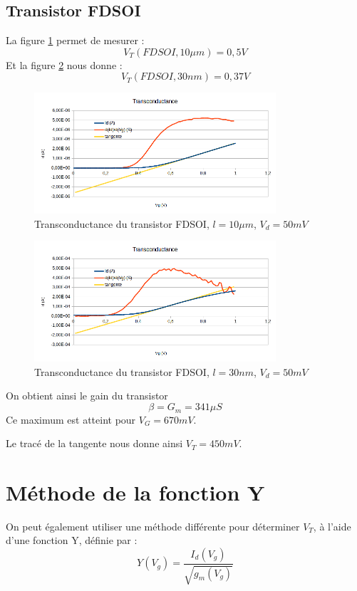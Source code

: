 \documentclass[a4paper,11pt]{report}
\begin{document}
\subsection{Transistor FDSOI}
La figure \ref{transc_fdsoi_10um} permet de mesurer :
\[V_T(FDSOI, 10\mu m) = 0,5V
\]
Et la figure \ref{transc_fdsoi_30nm} nous donne :
\[V_T(FDSOI, 30nm) = 0,37V
\]


\begin{figure}[h]
    \begin{center}
        \includegraphics[width=0.8\textwidth]{Images/FD1-10-Transconductance}
        \caption{Transconductance du transistor FDSOI, $l=10\mu m$, $V_d = 50mV$}
        \label{transc_fdsoi_10um}
    \end{center}
\end{figure}
\begin{figure}[h]
    \begin{center}
        \includegraphics[width=0.8\textwidth]{Images/FD11-30-Transconductance}
        \caption{Transconductance du transistor FDSOI, $l=30nm$, $V_d = 50mV$}
        \label{transc_fdsoi_30nm}
    \end{center}
\end{figure}
\noindent On obtient ainsi le gain du transistor \[\beta=G_m=341\mu S\] Ce maximum est atteint pour $V_G=670mV$.

Le tracé de la tangente nous donne ainsi $V_T=450mV$.

\section{Méthode de la fonction Y}
On peut également utiliser une méthode différente pour déterminer $V_T$, à l'aide d'une fonction Y, définie par :
\[Y(V_g)=\dfrac{I_d(V_g)}{\sqrt{g_m(V_g)}}\]
\end{document}
